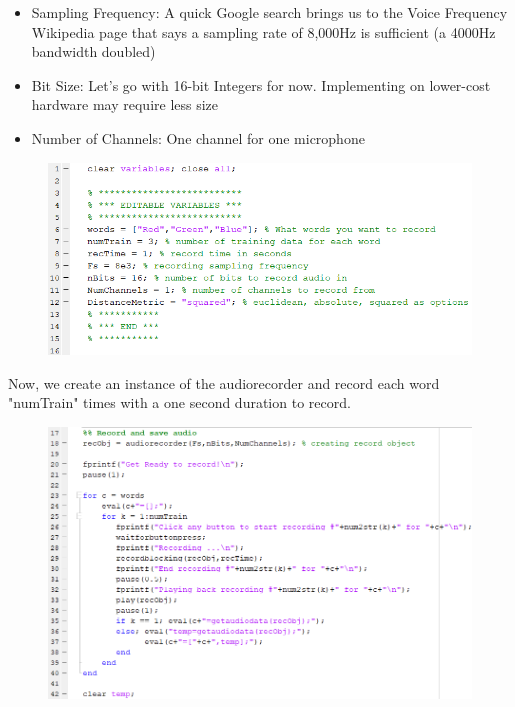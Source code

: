 \documentclass{article}
\begin{document}
\begin{itemize}
    \item Sampling Frequency: A quick Google search brings us to the Voice Frequency Wikipedia page that says a sampling rate of 8,000Hz is sufficient (a 4000Hz bandwidth doubled)
    \item Bit Size: Let's go with 16-bit Integers for now. Implementing on lower-cost hardware may require less size
    \item Number of Channels: One channel for one microphone
\end{itemize}

\begin{figure}[H]
    \centering
    \includegraphics[width=\linewidth]{MATLAB_variables.png}
    \caption{}
    \label{fig:MATLAB_variables}
\end{figure}

Now, we create an instance of the audiorecorder and record each word "numTrain" times with a one second duration to record.

\begin{figure}[H]
    \centering
    \includegraphics[width=\linewidth]{MATLAB_recordTrainingAudio.png}
    \caption{}
    \label{fig:MATLAB_recTrainAudio}
\end{figure}
\end{document}
